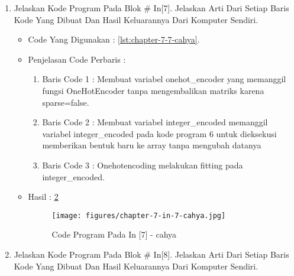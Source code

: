 \begin{enumerate}
\begin{itemize}
\begin{enumerate}
\end{enumerate}
\par
\item Hasil : \ref{chapter-7-in-6-cahya}
\par
\par
\begin{figure}[!hbtp]
\centering
\texttt{[image: figures/Chapter 7/1164066/Praktek/chapter-7-in-6-cahya.jpg]}
\caption{Code Program Pada In [6] - cahya}
\label{chapter-7-in-6-cahya}
\end{figure}
\end{itemize}r
\item Jelaskan Kode Program Pada Blok \# In[7]. Jelaskan Arti Dari Setiap Baris Kode Yang Dibuat Dan Hasil Keluarannya Dari Komputer Sendiri.
\begin{itemize}
\item Code Yang Digunakan : \ref{lst:chapter-7-7-cahya}.

\par
\par
\item Penjelasan Code Perbaris	: 
\begin{enumerate}
\item Baris Code 1	: Membuat variabel onehot\_encoder yang memanggil fungsi OneHotEncoder tanpa mengembalikan matriks karena sparse=false.
\item Baris Code 2	: Membuat variabel integer\_encoded memanggil variabel integer\_encoded pada kode program 6 untuk dieksekusi memberikan bentuk baru ke array tanpa mengubah datanya 
\item Baris Code 3	: Onehotencoding melakukan fitting pada integer\_encoded.
\end{enumerate}
\item Hasil : \ref{chapter-7-in-7-cahya}
\par
\par
\begin{figure}[!hbtp]
\centering
\texttt{[image: figures/chapter-7-in-7-cahya.jpg]}
\caption{Code Program Pada In [7] - cahya}
\label{chapter-7-in-7-cahya}
\end{figure}
\par
\par
\end{itemize}
\par
\par
\par
\item Jelaskan Kode Program Pada Blok \# In[8]. Jelaskan Arti Dari Setiap Baris Kode Yang Dibuat Dan Hasil Keluarannya Dari Komputer Sendiri.

\end{enumerate}
